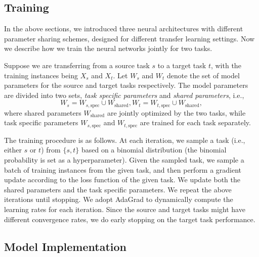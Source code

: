 \subsection{Training}

In the above sections, we introduced three neural architectures with different parameter sharing schemes, designed for different transfer learning settings. Now we describe how we train the neural networks jointly for two tasks.

Suppose we are transferring from a source task $s$ to a target task $t$, with the training instances being $X_s$ and $X_t$. Let $W_s$ and $W_t$ denote the set of model parameters for the source and target tasks respectively. The model parameters are divided into two sets, \textit{task specific parameters} and \textit{shared parameters}, i.e.,
\[
W_s = W_{s, \mbox{spec}} \cup W_{\mbox{shared}}, W_t = W_{t, \mbox{spec}} \cup W_{\mbox{shared}},
\]
where shared parameters $W_{\mbox{shared}}$ are jointly optimized by the two tasks, while task specific parameters $W_{s, \mbox{spec}}$ and $W_{t, \mbox{spec}}$ are trained for each task separately.

The training procedure is as follows. At each iteration, we sample a task (i.e., either $s$ or $t$) from $\{s, t\}$ based on a binomial distribution (the binomial probability is set as a hyperparameter). Given the sampled task, we sample a batch of training instances from the given task, and then perform a gradient update according to the loss function of the given task. We update both the shared parameters and the task specific parameters. We repeat the above iterations until stopping. We adopt AdaGrad \citep{duchi2011adaptive} to dynamically compute the learning rates for each iteration. Since the source and target tasks might have different convergence rates, we do early stopping on the target task performance.

\subsection{Model Implementation} \label{sec:imp}

